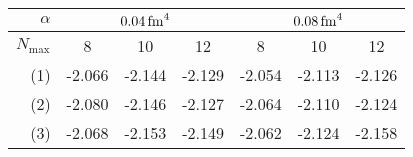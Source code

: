 \begin{table}[H]
  \caption{Extrapolation results in \si[]{\mega\electronvolt} of the difference based framework for the nuclei  \textbf{(a)},  \textbf{(b)} and  \textbf{(c)}. For each interaction characterized by the flow parameter $\alpha = \srg{0.04}, \srg{0.08}$, the final extrapolation results for the given $N_\mathrm{max}$ value is shown. Here, \textbf{(1)} is our basic extrapolation without further modifications of the training process, \textbf{(2)} is the $N_\mathrm{max}$-limitation training mode, \textbf{(3)} is the SRG-filter training mode. }
  \label{tab:eval_diff}
  \centering
  \begin{subtable}{\textwidth}
    \caption{}
    \centering
    \begin{tabular}{
        r|
        S[table-format=-2.3(3)]
        S[table-format=-2.3(3)]
        S[table-format=-2.3(3)]
        S[table-format=-2.3(3)]
        S[table-format=-2.3(3)]
        S[table-format=-2.3(3)]
      }
      \toprule
      $\alpha$                         &
       &
         \\
      \midrule
      $N_\mathrm{max}$                 &
      {8}                              &
      {10}                             &
      {12}                             &
      {8}                              &
      {10}                             &
      {12}                               \\
      \midrule
      (1)                              &
      -2.066                  &
      -2.144                  &
      -2.129                  &
      -2.054                  &
      -2.113                  &
      -2.126                    \\
      (2)                              &
      -2.080                  &
      -2.146                  &
      -2.127                  &
      -2.064                  &
      -2.110                  &
      -2.124                    \\
      (3)                              &
      -2.068                  &
      -2.153                  &
      -2.149                  &
      -2.062                  &
      -2.124                  &
      -2.158                    \\
      \bottomrule
    \end{tabular}

\end{subtable}
\end{table}
